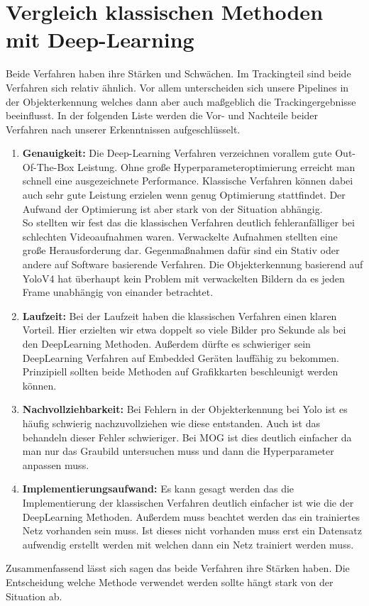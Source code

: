 \documentclass[conference]{IEEEtran}
\begin{document}
	\section{Vergleich klassischen Methoden mit Deep-Learning}
	Beide Verfahren haben ihre Stärken und Schwächen. Im Trackingteil sind beide Verfahren sich relativ ähnlich. Vor allem unterscheiden sich unsere Pipelines in der Objekterkennung welches dann aber auch maßgeblich die Trackingergebnisse beeinflusst. In der folgenden Liste werden die Vor- und Nachteile beider Verfahren nach unserer Erkenntnissen aufgeschlüsselt.
	\begin{enumerate}
		\item \textbf{Genauigkeit:} Die Deep-Learning Verfahren verzeichnen vorallem gute Out-Of-The-Box Leistung. Ohne große Hyperparameteroptimierung erreicht man schnell eine ausgezeichnete Performance. Klassische Verfahren können dabei auch sehr gute Leistung erzielen wenn genug Optimierung stattfindet. Der Aufwand der Optimierung ist aber stark von der Situation abhängig.\\
		So stellten wir fest das die klassischen Verfahren deutlich fehleranfälliger bei schlechten Videoaufnahmen waren. Verwackelte Aufnahmen stellten eine große Herausforderung dar. Gegenmaßnahmen dafür sind ein Stativ oder andere auf Software basierende Verfahren. Die Objekterkennung basierend auf YoloV4 hat überhaupt kein Problem mit verwackelten Bildern da es jeden Frame unabhängig von einander betrachtet.
		
		\item \textbf{Laufzeit:} Bei der Laufzeit haben die klassischen Verfahren einen klaren Vorteil. Hier erzielten wir etwa doppelt so viele Bilder pro Sekunde als bei den DeepLearning Methoden. Außerdem dürfte es schwieriger sein DeepLearning Verfahren auf Embedded Geräten lauffähig zu bekommen. Prinzipiell sollten beide Methoden auf Grafikkarten beschleunigt werden können.
		
		\item \textbf{Nachvollziehbarkeit:} Bei Fehlern in der Objekterkennung bei Yolo ist es häufig schwierig nachzuvollziehen wie diese entstanden. Auch ist das behandeln dieser Fehler schwieriger. Bei MOG ist dies deutlich einfacher da man nur das Graubild untersuchen muss und dann die Hyperparameter anpassen muss.
		
		\item \textbf{Implementierungsaufwand:} Es kann gesagt werden das die Implementierung der klassischen Verfahren deutlich einfacher ist wie die der DeepLearning Methoden. Außerdem muss beachtet werden das ein trainiertes Netz vorhanden sein muss. Ist dieses nicht vorhanden muss erst ein Datensatz aufwendig erstellt werden mit welchen dann ein Netz trainiert werden muss.
		
	\end{enumerate}
	Zusammenfassend lässt sich sagen das beide Verfahren ihre Stärken haben. Die Entscheidung welche Methode verwendet werden sollte hängt stark von der Situation ab.
	
\end{document}
